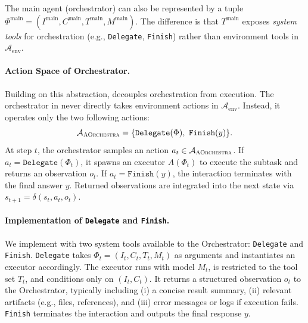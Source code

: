 The main agent (orchestrator) can also be represented by a tuple
$\Phi^{\text{main}}=(I^{\text{main}},C^{\text{main}},T^{\text{main}},M^{\text{main}})$.
The difference is that $T^{\text{main}}$ exposes \emph{system tools} for orchestration (e.g., \texttt{Delegate}, \texttt{Finish}) rather than environment tools in $\mathcal{A}_{\text{env}}$.

\paragraph{Action Space of Orchestrator.}
Building on this abstraction, \our{} decouples orchestration from execution.
The orchestrator in \our{} never directly takes environment actions in $\mathcal{A}_{\text{env}}$.
Instead, it operates only the two following actions:
\[
\mathcal{A}_{\our} = \{\texttt{Delegate}(\Phi),\ \texttt{Finish}(y)\}.
\]
At step $t$, the orchestrator samples an action $a_t \in \mathcal{A}_{\textsc{AOrchestra}}$.
If $a_t=\texttt{Delegate}(\Phi_t)$, it spawns an executor $A(\Phi_t)$ to execute the subtask and returns an observation $o_t$.
If $a_t=\texttt{Finish}(y)$, the interaction terminates with the final answer $y$.
Returned observations are integrated into the next state via $s_{t+1}=\delta(s_t,a_t,o_t)$.

\paragraph{Implementation of \texttt{Delegate} and \texttt{Finish}.}
We implement \our{} with two system tools available to the Orchestrator: \texttt{Delegate} and \texttt{Finish}.
\texttt{Delegate} takes $\Phi_t=(I_t,C_t,T_t,M_t)$ as arguments and instantiates an executor accordingly.
The executor runs with model $M_t$, is restricted to the tool set $T_t$, and conditions only on $(I_t,C_t)$.
It returns a structured observation $o_t$ to the Orchestrator, typically including (i) a concise result summary, (ii) relevant artifacts (e.g., files, references), and (iii) error messages or logs if execution fails.
\texttt{Finish} terminates the interaction and outputs the final response $y$.


